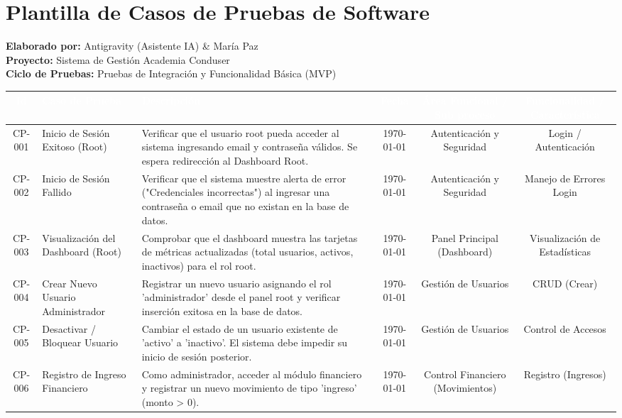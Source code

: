 \documentclass[10pt, a4paper, landscape]{article}
\begin{document}
\section*{\huge \textbf{Plantilla de Casos de Pruebas de Software}}
{\Large \textbf{Elaborado por:} Antigravity (Asistente IA) \& María Paz} \\
\textbf{Proyecto:} Sistema de Gestión Academia Conduser \\
\textbf{Ciclo de Pruebas:} Pruebas de Integración y Funcionalidad Básica (MVP)

\vspace{0.5cm}

\renewcommand{\arraystretch}{1.8}
\begin{tabularx}{\textwidth}{|c|X|X|c|c|c|}
\hline
\rowcolor{headerblue} 
\textcolor{white}{\textbf{Id}} & 
\textcolor{white}{\textbf{Caso de Prueba}} & 
\textcolor{white}{\textbf{Descripción}} & 
\textcolor{white}{\textbf{Fecha}} & 
\textcolor{white}{\textbf{Área Funcional / Sub proceso}} & 
\textcolor{white}{\textbf{Funcionalidad / Característica}} \\
\hline
CP-001 & Inicio de Sesión Exitoso (Root) & Verificar que el usuario root pueda acceder al sistema ingresando email y contraseña válidos. Se espera redirección al Dashboard Root. & \today & Autenticación y Seguridad & Login / Autenticación \\
\hline
CP-002 & Inicio de Sesión Fallido & Verificar que el sistema muestre alerta de error ("Credenciales incorrectas") al ingresar una contraseña o email que no existan en la base de datos. & \today & Autenticación y Seguridad & Manejo de Errores Login \\
\hline
CP-003 & Visualización del Dashboard (Root) & Comprobar que el dashboard muestra las tarjetas de métricas actualizadas (total usuarios, activos, inactivos) para el rol root. & \today & Panel Principal (Dashboard) & Visualización de Estadísticas \\
\hline
CP-004 & Crear Nuevo Usuario Administrador & Registrar un nuevo usuario asignando el rol 'administrador' desde el panel root y verificar inserción exitosa en la base de datos. & \today & Gestión de Usuarios & CRUD (Crear) \\
\hline
CP-005 & Desactivar / Bloquear Usuario & Cambiar el estado de un usuario existente de 'activo' a 'inactivo'. El sistema debe impedir su inicio de sesión posterior. & \today & Gestión de Usuarios & Control de Accesos \\
\hline
CP-006 & Registro de Ingreso Financiero & Como administrador, acceder al módulo financiero y registrar un nuevo movimiento de tipo 'ingreso' (monto > 0). & \today & Control Financiero (Movimientos) & Registro (Ingresos) \\

\end{tabularx}
\end{document}
